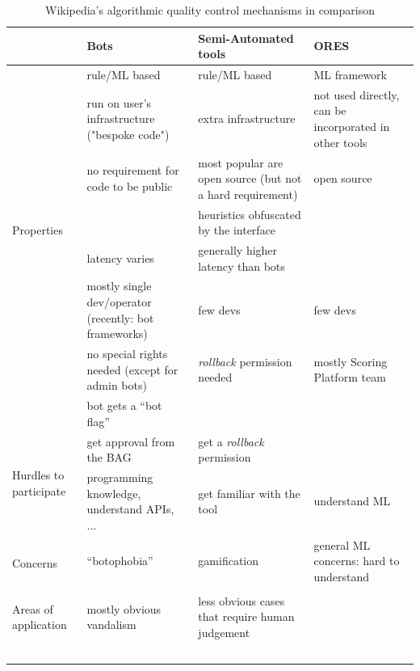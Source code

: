 \begin{landscape}
    \begin{longtable}{ | p{4cm} | p{5.5cm} | p{5.5cm} | p{5.5cm} | }
    \hline
               & Bots & Semi-Automated tools & ORES \\
    \hline
    \multirow{7}{*}{Properties} & rule/ML based & rule/ML based & ML framework \\
                               & run on user's infrastructure ("bespoke code") & extra infrastructure & not used directly, can be incorporated in other tools \\
                               & no requirement for code to be public & most popular are open source (but not a hard requirement) & open source \\
                               & & heuristics obfuscated by the interface & \\
                               & latency varies & generally higher latency than bots & \\
                               & mostly single dev/operator (recently: bot frameworks) & few devs & few devs \\
    \hline
    \multirow{2}{*}{People involved} & no special rights needed (except for admin bots) & \emph{rollback} permission needed & mostly Scoring Platform team \\
                                     & bot gets a ``bot flag'' & & \\
    \hline
        \multirow{2}{*}{Hurdles to participate} & get approval from the BAG & get a \emph{rollback} permission& \\
                                            & programming knowledge, understand APIs, ... & get familiar with the tool & understand ML \\
    \hline
        \multirow{2}{*}{Concerns} & ``botophobia'' & gamification & general ML concerns: hard to understand \\
                                  & & & \\
    \hline
        Areas of application & mostly obvious vandalism & less obvious cases that require human judgement & \\
    \hline
    \caption{Wikipedia's algorithmic quality control mechanisms in comparison}~\label{table:mechanisms-comparison-literature}
\end{longtable}
\end{landscape}

